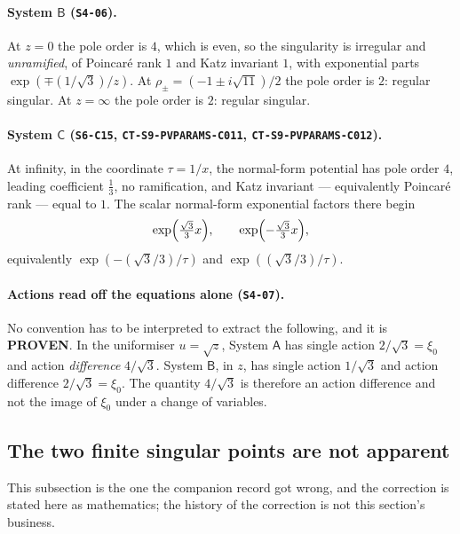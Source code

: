 \paragraph{System $\mathsf B$ (\texttt{S4-06}).} At $z=0$ the pole order is
$4$, which is even, so the singularity is irregular and \emph{unramified}, of
Poincar\'e rank $1$ and Katz invariant $1$, with exponential parts
$\exp(\mp(1/\sqrt3)/z)$. At $\rho_\pm=(-1\pm i\sqrt{11})/2$ the pole order is
$2$: regular singular. At $z=\infty$ the pole order is $2$: regular singular.

\paragraph{System $\mathsf C$ (\texttt{S6-C15}, \texttt{CT-S9-PVPARAMS-C011},
\texttt{CT-S9-PVPARAMS-C012}).} At infinity, in the coordinate $\tau=1/x$, the
normal-form potential has pole order $4$, leading coefficient $\tfrac13$, no
ramification, and Katz invariant --- equivalently Poincar\'e rank --- equal to
$1$. The scalar normal-form exponential factors there begin
\[
  \exp\Bigl(\tfrac{\sqrt3}{3}x\Bigr),\qquad
  \exp\Bigl(-\tfrac{\sqrt3}{3}x\Bigr),
\]
equivalently $\exp(-(\sqrt3/3)/\tau)$ and $\exp((\sqrt3/3)/\tau)$.

\paragraph{Actions read off the equations alone (\texttt{S4-07}).} No
convention has to be interpreted to extract the following, and it is
\textbf{PROVEN}. In the uniformiser $u=\sqrt z$, System $\mathsf A$ has single
action $2/\sqrt3=\xi_0$ and action \emph{difference} $4/\sqrt3$. System
$\mathsf B$, in $z$, has single action $1/\sqrt3$ and action difference
$2/\sqrt3=\xi_0$. The quantity $4/\sqrt3$ is therefore an action difference and
not the image of $\xi_0$ under a change of variables.

\subsection{The two finite singular points are not apparent}
\label{ssec:nonapparent}

This subsection is the one the companion record got wrong, and the correction
is stated here as mathematics; the history of the correction is not this
section's business.

